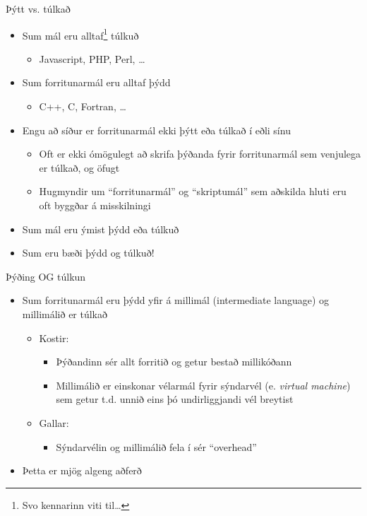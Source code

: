 \documentclass[handout]{beamer}
\begin{document}
\begin{frame}{Þýtt vs. túlkað}
\begin{itemize}
 \item Sum mál eru alltaf\footnote{Svo kennarinn viti til\ldots} túlkuð
 \begin{itemize}
  \item Javascript, PHP, Perl, \ldots
 \end{itemize}
  \item Sum forritunarmál eru alltaf þýdd
 \begin{itemize}
  \item C++, C, Fortran, \ldots
 \end{itemize}
 \item Engu að síður er forritunarmál ekki þýtt eða túlkað í eðli sínu
 \begin{itemize}
  \item Oft er ekki ómögulegt að skrifa þýðanda fyrir forritunarmál sem venjulega er túlkað, og öfugt
  \item Hugmyndir um ``forritunarmál'' og ``skriptumál'' sem aðskilda hluti eru oft byggðar á misskilningi
 \end{itemize}
 \item Sum mál eru ýmist þýdd eða túlkuð
 \item Sum eru bæði þýdd og túlkuð!
\end{itemize}
\end{frame}

\begin{frame}{Þýðing OG túlkun}
\begin{itemize}
 \item Sum forritunarmál eru þýdd yfir á millimál (intermediate language) og millimálið er túlkað
 \begin{itemize}
  \item Kostir:
  \begin{itemize}
   \item Þýðandinn sér allt forritið og getur bestað millikóðann
   \item Millimálið er einskonar vélarmál fyrir sýndarvél (e. \emph{virtual machine}) sem getur t.d. unnið eins þó undirliggjandi vél breytist
  \end{itemize}
  \item Gallar:
  \begin{itemize}
   \item Sýndarvélin og millimálið fela í sér ``overhead''
  \end{itemize}
 \end{itemize}
 \item Þetta er mjög algeng aðferð
\end{itemize}
\end{frame}
\end{document}
